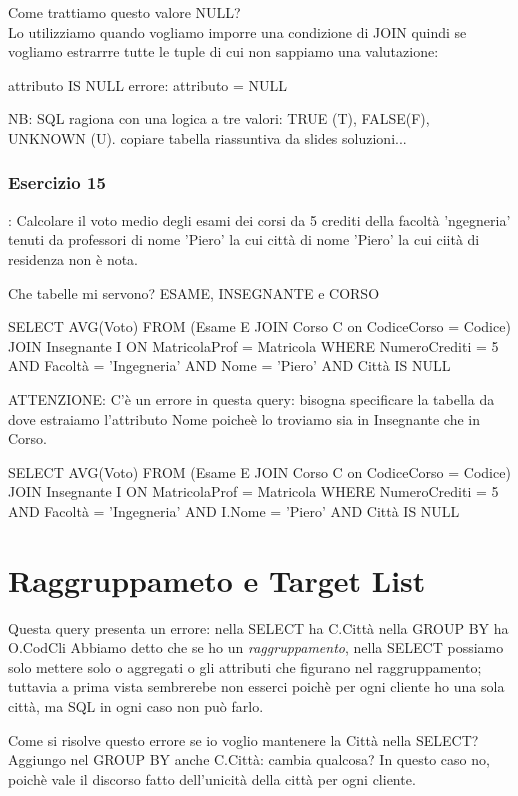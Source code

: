 \documentclass[12pt,a4paper]{book}
\begin{document}
Come trattiamo questo valore NULL?\\
Lo utilizziamo quando vogliamo imporre una condizione di JOIN quindi se vogliamo estrarrre tutte le tuple di cui non sappiamo una valutazione:

    attributo IS NULL errore: attributo = NULL

NB: SQL ragiona con una logica a tre valori: TRUE (T), FALSE(F), UNKNOWN (U).
copiare tabella riassuntiva da slides soluzioni...

\subsubsection{Esercizio 15}: Calcolare il voto medio degli esami dei corsi da 5 crediti della facoltà 'ngegneria' tenuti da professori di nome 'Piero' la cui città di nome 'Piero' la cui ciità di residenza non è nota.

Che tabelle mi servono? 
ESAME, INSEGNANTE e CORSO

SELECT AVG(Voto)
FROM (Esame E JOIN Corso C on CodiceCorso = Codice) JOIN Insegnante I ON MatricolaProf = Matricola
WHERE NumeroCrediti = 5 AND Facoltà = 'Ingegneria' AND Nome = 'Piero' AND Città IS NULL

ATTENZIONE: C'è un errore in questa query: bisogna specificare la tabella da dove estraiamo l'attributo Nome poicheè lo troviamo sia in Insegnante che in Corso.

SELECT AVG(Voto)
FROM (Esame E JOIN Corso C on CodiceCorso = Codice) JOIN Insegnante I ON MatricolaProf = Matricola
WHERE NumeroCrediti = 5 AND Facoltà = 'Ingegneria' AND I.Nome = 'Piero' AND Città IS NULL



\section{Raggruppameto e Target List}
Questa query presenta un errore:
nella SELECT ha C.Città
nella GROUP BY ha O.CodCli
Abbiamo detto che se ho un \emph{raggruppamento}, nella SELECT possiamo solo mettere solo o aggregati o gli attributi che figurano nel raggruppamento; tuttavia a prima vista sembrerebe non esserci poichè per ogni cliente ho una sola città, ma SQL in ogni caso non può farlo.

Come si risolve questo errore se io voglio mantenere la Città nella SELECT?
Aggiungo nel GROUP BY anche C.Città: cambia qualcosa? In questo caso no, poichè vale il discorso fatto dell'unicità della città per ogni cliente.
\end{document}
